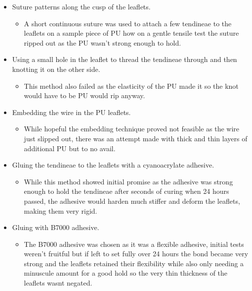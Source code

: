 \begin{itemize}
    \item Suture patterns along the cusp of the leaflets.
          \begin{itemize}
              \item A short continuous suture was used to attach a few tendineae to the leaflets on a sample piece of \gls{PU} how on a gentle tensile test the suture ripped out as the \gls{PU} wasn't strong enough to hold.
          \end{itemize}
    \item Using a small hole in the leaflet to thread the tendineae through and then knotting it on the other side.
          \begin{itemize}
              \item This method also failed as the elasticity of the \gls{PU} made it so the knot would have to be \gls{PU} would rip anyway.
          \end{itemize}
    \item Embedding the wire in the \gls{PU} leaflets.
          \begin{itemize}
              \item While hopeful the embedding technique proved not feasible as the wire just slipped out, there was an attempt made with thick and thin layers of additional \gls{PU} but to no avail.
          \end{itemize}
    \item Gluing the tendineae to the leaflets with a cyanoacrylate adhesive.
          \begin{itemize}
              \item While this method showed initial promise as the adhesive was strong enough to hold the tendineae after seconds of curing when 24 hours passed, the adhesive would harden much stiffer and deform the leaflets, making them very rigid.
          \end{itemize}
    \item Gluing with B7000 adhesive.
          \begin{itemize}
              \item The B7000 adhesive was chosen as it was a flexible adhesive, initial tests weren't fruitful but if left to set fully over 24 hours the bond became very strong and the leaflets retained their flexibility while also only needing a minuscule amount for a good hold so the very thin thickness of the leaflets wasnt negated.
          \end{itemize}
\end{itemize}

